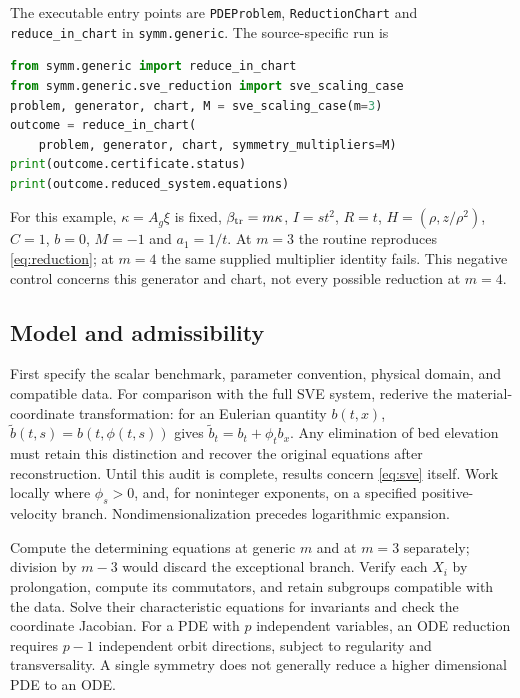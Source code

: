 \documentclass[11pt]{article}
\begin{document}
The executable entry points are \texttt{PDEProblem},
\texttt{ReductionChart} and \texttt{reduce\_in\_chart} in
\texttt{symm.generic}. The source-specific run is
\begin{lstlisting}[language=Python]
from symm.generic import reduce_in_chart
from symm.generic.sve_reduction import sve_scaling_case
problem, generator, chart, M = sve_scaling_case(m=3)
outcome = reduce_in_chart(
    problem, generator, chart, symmetry_multipliers=M)
print(outcome.certificate.status)
print(outcome.reduced_system.equations)
\end{lstlisting}
For this example, $\kappa=A_g\xi$ is fixed, $\beta_{\rm tr}=m\kappa$,
$I=st^2$, $R=t$, $H=(\rho,z/\rho^2)$, $C=1$, $b=0$,
$M=-1$ and $a_1=1/t$. At $m=3$ the routine reproduces
\eqref{eq:reduction}; at $m=4$ the same supplied multiplier identity fails.
This negative control concerns this generator and chart, not every possible
reduction at $m=4$.

\subsection{Model and admissibility}
First specify the scalar benchmark, parameter convention, physical domain,
and compatible data. For comparison with the full SVE system, rederive the
material-coordinate transformation: for an Eulerian quantity $b(t,x)$,
$\widetilde b(t,s)=b(t,\phi(t,s))$ gives
$\widetilde b_t=b_t+\phi_t b_x$. Any elimination of bed elevation must retain
this distinction and recover the original equations after reconstruction.
Until this audit is complete, results concern \eqref{eq:sve} itself.
Work locally where $\phi_s>0$, and, for noninteger exponents, on a specified
positive-velocity branch. Nondimensionalization precedes logarithmic expansion.

Compute the determining equations at generic $m$ and at $m=3$ separately;
division by $m-3$ would discard the exceptional branch. Verify each $X_i$
by prolongation, compute its commutators, and retain subgroups compatible
with the data. Solve their characteristic equations for invariants and check
the coordinate Jacobian. For a PDE with $p$ independent variables, an ODE
reduction requires $p-1$ independent orbit directions, subject to regularity
and transversality. A single symmetry does not generally reduce a higher
dimensional PDE to an ODE.
\end{document}
